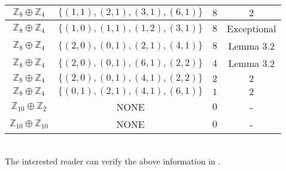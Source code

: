 \documentclass[article,dvisp]{amsart}
\def\Z{\mathbb{Z}}
\theoremstyle{definition}
\theoremstyle{remark}
\numberwithin{equation}{section}
\theoremstyle{lemma}
\begin{document}
\begin{center}
\begin{tabular}{|c|c|c|c|}
$\Z_{8}\oplus\Z_{4}$&$\{(1,1),(2,1),(3,1),(6,1)\}$&$8$&$2$\\
\hline
$\Z_{8}\oplus\Z_{4}$&$\{(1,0),(1,1),(1,2),(3,1)\}$&$8$& Exceptional\\
\hline
$\Z_{8}\oplus\Z_{4}$&$\{(2,0),(0,1),(2,1),(4,1)\}$&$8$& Lemma 3.2\\
\hline
$\Z_{8}\oplus\Z_{4}$&$\{(2,0),(0,1),(6,1),(2,2)\}$&$4$& Lemma 3.2 \\
\hline
$\Z_{8}\oplus\Z_{4}$&$\{(2,0),(0,1),(4,1),(2,2)\}$&$2$&$2$\\
\hline
$\Z_{8}\oplus\Z_{4}$&$\{(0,1),(2,1),(4,1),(6,1)\}$&$1$&$2$\\
\hline
$\Z_{10}\oplus \Z_{2}$& NONE &$0$&-\\
\hline
$\Z_{10}\oplus \Z_{10}$& NONE &$0$&-\\
\hline
\end{tabular}
\end{center}\
\\
The interested reader can verify the above information in \cite{W}.
\newpage

\maketitle\appendix
\end{document}
